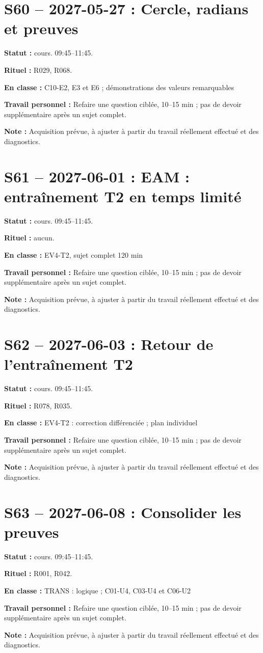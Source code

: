 \section*{S60 -- 2027-05-27 : Cercle, radians et preuves}
\textbf{Statut :} cours. 09:45–11:45.\par\textbf{Rituel :} R029, R068.\par\textbf{En classe :} C10-E2, E3 et E6 ; démonstrations des valeurs remarquables\par\textbf{Travail personnel :} Refaire une question ciblée, 10–15 min ; pas de devoir supplémentaire après un sujet complet.\par\textbf{Note :} Acquisition prévue, à ajuster à partir du travail réellement effectué et des diagnostics.
\section*{S61 -- 2027-06-01 : EAM : entraînement T2 en temps limité}
\textbf{Statut :} cours. 09:45–11:45.\par\textbf{Rituel :} aucun.\par\textbf{En classe :} EV4-T2, sujet complet 120 min\par\textbf{Travail personnel :} Refaire une question ciblée, 10–15 min ; pas de devoir supplémentaire après un sujet complet.\par\textbf{Note :} Acquisition prévue, à ajuster à partir du travail réellement effectué et des diagnostics.
\section*{S62 -- 2027-06-03 : Retour de l’entraînement T2}
\textbf{Statut :} cours. 09:45–11:45.\par\textbf{Rituel :} R078, R035.\par\textbf{En classe :} EV4-T2 : correction différenciée ; plan individuel\par\textbf{Travail personnel :} Refaire une question ciblée, 10–15 min ; pas de devoir supplémentaire après un sujet complet.\par\textbf{Note :} Acquisition prévue, à ajuster à partir du travail réellement effectué et des diagnostics.
\section*{S63 -- 2027-06-08 : Consolider les preuves}
\textbf{Statut :} cours. 09:45–11:45.\par\textbf{Rituel :} R001, R042.\par\textbf{En classe :} TRANS : logique ; C01-U4, C03-U4 et C06-U2\par\textbf{Travail personnel :} Refaire une question ciblée, 10–15 min ; pas de devoir supplémentaire après un sujet complet.\par\textbf{Note :} Acquisition prévue, à ajuster à partir du travail réellement effectué et des diagnostics.
